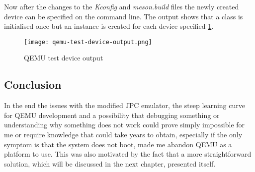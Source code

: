 \begin{codeblock}
    
\end{codeblock}

\noindent
Now after the changes to the \emph{Kconfig} and \emph{meson.build} files the
newly created device can be specified on the command line. The output shows
that a class is initialised  once but an instance is created for each device
specified \ref{fig:qemu-test-device-output}.

\begin{figure}[H]
    \centering
    \texttt{[image: qemu-test-device-output.png]}
    \caption{QEMU test device output}
    \label{fig:qemu-test-device-output}
\end{figure}

\subsection{Conclusion}

In the end the issues with the modified JPC emulator, the steep learning curve
for QEMU development and a possibility that debugging something or
understanding why something does not work could prove simply impossible for me
or require knowledge that could take years to obtain, especially if the only
symptom is that the system does not boot, made me abandon QEMU as a platform to
use. This was also motivated by the fact that a more straightforward solution,
which will be discussed in the next chapter,  presented itself.

